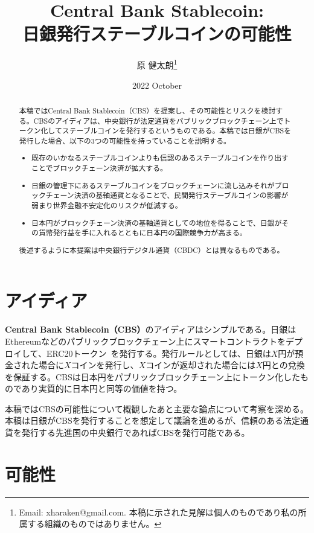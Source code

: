 \documentclass[dvipdfmx,a4paper]{jsarticle}
\title{\textbf{Central Bank Stablecoin:\\日銀発行ステーブルコインの可能性}}
\author{原 健太朗\footnote{Email: xharaken@gmail.com. 本稿に示された見解は個人のものであり私の所属する組織のものではありません。}}
\date{2022 October}
\begin{document}
\maketitle

\begin{abstract}

本稿ではCentral Bank Stablecoin（CBS）を提案し、その可能性とリスクを検討する。CBSのアイディアは、中央銀行が法定通貨をパブリックブロックチェーン上でトークン化してステーブルコインを発行するというものである。本稿では日銀がCBSを発行した場合、以下の3つの可能性を持っていることを説明する。

\begin{itemize}
\item 既存のいかなるステーブルコインよりも信認のあるステーブルコインを作り出すことでブロックチェーン決済が拡大する。
\item 日銀の管理下にあるステーブルコインをブロックチェーンに流し込みそれがブロックチェーン決済の基軸通貨となることで、民間発行ステーブルコインの影響が弱まり世界金融不安定化のリスクが低減する。
\item 日本円がブロックチェーン決済の基軸通貨としての地位を得ることで、日銀がその貨幣発行益を手に入れるとともに日本円の国際競争力が高まる。
\end{itemize}

後述するように本提案は中央銀行デジタル通貨（CBDC）とは異なるものである。

\end{abstract}

\section{アイディア}

\textbf{Central Bank Stablecoin（CBS）}のアイディアはシンプルである。日銀はEthereumなどのパブリックブロックチェーン上にスマートコントラクトをデプロイして、ERC20トークン~\cite{erc20token}を発行する。発行ルールとしては、日銀は$X$円が預金された場合に$X$コインを発行し、$X$コインが返却された場合には$X$円との兌換を保証する。CBSは日本円をパブリックブロックチェーン上にトークン化したものであり実質的に日本円と同等の価値を持つ。

本稿ではCBSの可能性について概観したあと主要な論点について考察を深める。本稿は日銀がCBSを発行することを想定して議論を進めるが、信頼のある法定通貨を発行する先進国の中央銀行であればCBSを発行可能である。

\section{可能性}
\end{document}
